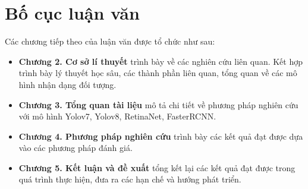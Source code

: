 \documentclass[../the.tex]{subfiles}
\begin{document}
\section{Bố cục luận văn}
\label{bo_cuc}

{\fontsize{13}{12} \selectfont
Các chương tiếp theo của luận văn được tổ chức như sau:

\begin{itemize}
  \item \textbf{Chương 2. Cơ sở lí thuyết} trình bày về các nghiên cứu liên quan. Kết hợp trình bày lý thuyết học sâu, các thành phần liên quan, tổng quan về các mô hình nhận dạng đối tượng.
  \item \textbf{Chương 3. Tổng quan tài liệu} mô tả chi tiết về phương pháp nghiên cứu với mô hình Yolov7, Yolov8, RetinaNet, FasterRCNN.
  \item \textbf{Chương 4. Phương pháp nghiên cứu} trình bày các kết quả đạt được dựa vào các phương pháp đánh giá.
  \item \textbf{Chương 5. Kết luận và đề xuất} tổng kết lại các kết quả đạt được trong quá trình thực hiện, đưa ra các hạn chế và hướng phát triển.
\end{itemize}
}
\bigskip





\end{document}
